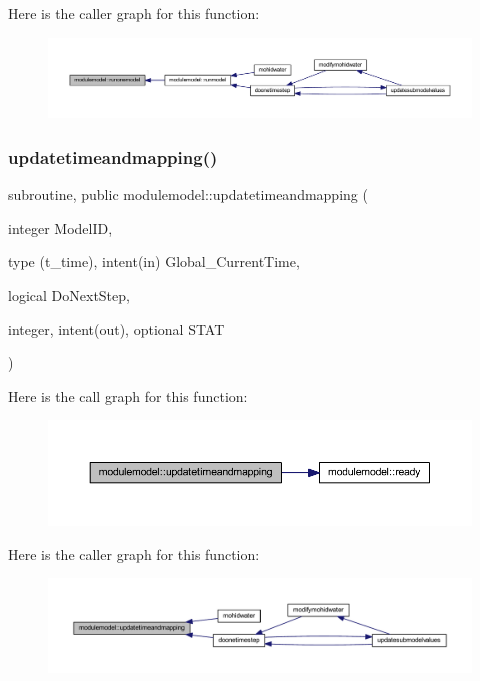 Here is the caller graph for this function\+:\nopagebreak
\begin{figure}[H]
\begin{center}
\leavevmode
\includegraphics[width=350pt]{namespacemodulemodel_ab22d85061a595a03c83c11766cba5587_icgraph}
\end{center}
\end{figure}
\mbox{\label{namespacemodulemodel_a4eb372bc7bfa08656aec97c250f8cf7b}} 
\subsubsection{\texorpdfstring{updatetimeandmapping()}{updatetimeandmapping()}}
{\footnotesize\ttfamily subroutine, public modulemodel\+::updatetimeandmapping (\begin{DoxyParamCaption}\item[{integer}]{Model\+ID,  }\item[{type (t\+\_\+time), intent(in)}]{Global\+\_\+\+Current\+Time,  }\item[{logical}]{Do\+Next\+Step,  }\item[{integer, intent(out), optional}]{S\+T\+AT }\end{DoxyParamCaption})}

Here is the call graph for this function\+:\nopagebreak
\begin{figure}[H]
\begin{center}
\leavevmode
\includegraphics[width=350pt]{namespacemodulemodel_a4eb372bc7bfa08656aec97c250f8cf7b_cgraph}
\end{center}
\end{figure}
Here is the caller graph for this function\+:\nopagebreak
\begin{figure}[H]
\begin{center}
\leavevmode
\includegraphics[width=350pt]{namespacemodulemodel_a4eb372bc7bfa08656aec97c250f8cf7b_icgraph}
\end{center}
\end{figure}


